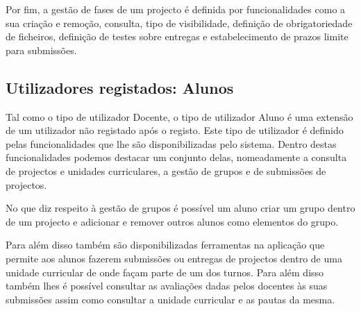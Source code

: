 Por fim, a gestão de fases de um projecto é definida por funcionalidades como a 
sua criação e remoção, consulta, tipo de visibilidade, definição de 
obrigatoriedade de ficheiros, definição de testes sobre entregas e estabelecimento de prazos limite 
para submissões.

\subsection{Utilizadores registados: Alunos}

Tal como o tipo de utilizador Docente, o tipo de utilizador Aluno é uma extensão 
de um utilizador não registado após o registo. Este tipo de utilizador é 
definido pelas funcionalidades que lhe são disponibilizadas pelo sistema. Dentro 
destas funcionalidades podemos destacar um conjunto delas, nomeadamente a 
consulta de projectos e unidades curriculares, a gestão de grupos e de submissões de projectos.

No que diz respeito à gestão de grupos é possível um aluno criar um grupo dentro 
de um projecto e adicionar e remover outros alunos como elementos do grupo.

Para além disso também são disponibilizadas ferramentas na aplicação que permite 
aos alunos fazerem submissões ou entregas de projectos dentro de uma unidade 
curricular de onde façam parte de um dos turnos. Para além disso também lhes é 
possível consultar as avaliações dadas pelos docentes às suas submissões assim 
como consultar a unidade curricular e as pautas da mesma.



